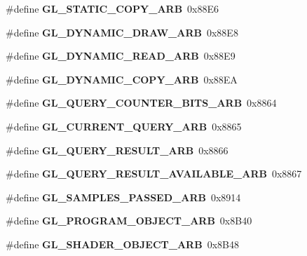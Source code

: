 \begin{DoxyCompactItemize}
\item 
\#define {\bfseries G\+L\+\_\+\+S\+T\+A\+T\+I\+C\+\_\+\+C\+O\+P\+Y\+\_\+\+A\+R\+B}~0x88\+E6\label{_s_d_l__opengl_8h_aecd9dc2bd498061b27ff70ec41f27886}

\item 
\#define {\bfseries G\+L\+\_\+\+D\+Y\+N\+A\+M\+I\+C\+\_\+\+D\+R\+A\+W\+\_\+\+A\+R\+B}~0x88\+E8\label{_s_d_l__opengl_8h_a08d478afbd15cb6a37c101dc152f7b0f}

\item 
\#define {\bfseries G\+L\+\_\+\+D\+Y\+N\+A\+M\+I\+C\+\_\+\+R\+E\+A\+D\+\_\+\+A\+R\+B}~0x88\+E9\label{_s_d_l__opengl_8h_a381dcfb8b8bfd7bd1082f82cf0f78535}

\item 
\#define {\bfseries G\+L\+\_\+\+D\+Y\+N\+A\+M\+I\+C\+\_\+\+C\+O\+P\+Y\+\_\+\+A\+R\+B}~0x88\+E\+A\label{_s_d_l__opengl_8h_aab5519bbfacbf59b42f90d4432d92fed}

\item 
\#define {\bfseries G\+L\+\_\+\+Q\+U\+E\+R\+Y\+\_\+\+C\+O\+U\+N\+T\+E\+R\+\_\+\+B\+I\+T\+S\+\_\+\+A\+R\+B}~0x8864\label{_s_d_l__opengl_8h_a300b9a43c952811ad00c3238824af96b}

\item 
\#define {\bfseries G\+L\+\_\+\+C\+U\+R\+R\+E\+N\+T\+\_\+\+Q\+U\+E\+R\+Y\+\_\+\+A\+R\+B}~0x8865\label{_s_d_l__opengl_8h_a1a99272a79beb2c11ee6d8df89dbdfa3}

\item 
\#define {\bfseries G\+L\+\_\+\+Q\+U\+E\+R\+Y\+\_\+\+R\+E\+S\+U\+L\+T\+\_\+\+A\+R\+B}~0x8866\label{_s_d_l__opengl_8h_afe6a7e6dd3fc749521facdc709f1b79e}

\item 
\#define {\bfseries G\+L\+\_\+\+Q\+U\+E\+R\+Y\+\_\+\+R\+E\+S\+U\+L\+T\+\_\+\+A\+V\+A\+I\+L\+A\+B\+L\+E\+\_\+\+A\+R\+B}~0x8867\label{_s_d_l__opengl_8h_a2767b059926f09b114c4b4ef555283ea}

\item 
\#define {\bfseries G\+L\+\_\+\+S\+A\+M\+P\+L\+E\+S\+\_\+\+P\+A\+S\+S\+E\+D\+\_\+\+A\+R\+B}~0x8914\label{_s_d_l__opengl_8h_ae15e94a6e68daec5a04c417d88776e4d}

\item 
\#define {\bfseries G\+L\+\_\+\+P\+R\+O\+G\+R\+A\+M\+\_\+\+O\+B\+J\+E\+C\+T\+\_\+\+A\+R\+B}~0x8\+B40\label{_s_d_l__opengl_8h_a01dbd05169c339aa106f4e19c4c68e6b}

\item 
\#define {\bfseries G\+L\+\_\+\+S\+H\+A\+D\+E\+R\+\_\+\+O\+B\+J\+E\+C\+T\+\_\+\+A\+R\+B}~0x8\+B48\label{_s_d_l__opengl_8h_acc1bdfb0670f8857acfe51b3c99ef5e2}


\end{DoxyCompactItemize}
